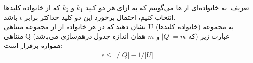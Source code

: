 تعریف: به خانواده‌ای از ها  می‌گوییم که به ازای هر دو کلید $k_1$ و $k_2$ که از خانواده کلیدها انتخاب کنیم،
احتمال برخورد این دو کلید حداکثر برابر $\epsilon$ باشد.
\\
نشان دهید که در هر خانواده از  از مجموعه متناهی U (خانواده کلیدها) به مجموعه متناهی Q (که $|Q|=m$ و $m$ همان اندازه جدول درهم‌سازی می‌باشد) عبارت زیر همواره برقرار است:
\begin{gather*} \epsilon \leq 1/|Q| - 1/|U| \end{gather*}